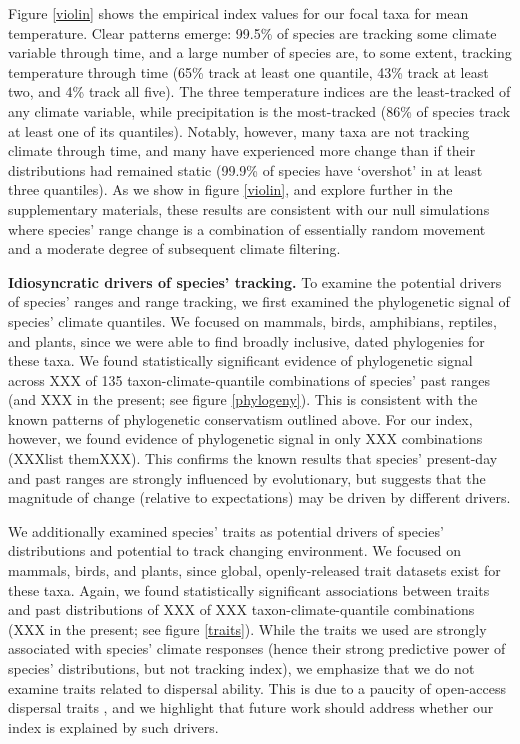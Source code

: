 \documentclass[12pt]{report}
\begin{document}
Figure \ref{violin} shows the empirical index values for our focal
taxa for mean temperature. Clear patterns emerge: 99.5\% of species
are tracking some climate variable through time, and a large number of
species are, to some extent, tracking temperature through time (65\%
track at least one quantile, 43\% track at least two, and 4\% track
all five). The three temperature indices are the least-tracked of any
climate variable, while precipitation is the most-tracked (86\% of
species track at least one of its quantiles). Notably, however, many
taxa are not tracking climate through time, and many have experienced
more change than if their distributions had remained static (99.9\% of
species have `overshot' in at least three quantiles). As we show in
figure \ref{violin}, and explore further in the supplementary
materials, these results are consistent with our null simulations
where species' range change is a combination of essentially random
movement and a moderate degree of subsequent climate filtering.

\textbf{Idiosyncratic drivers of species' tracking.} To examine the
potential drivers of species' ranges and range tracking, we first
examined the phylogenetic signal of species' climate quantiles. We
focused on mammals\supercite{xxx}, birds\supercite{xxx},
amphibians\supercite{xxx}, reptiles\supercite{xxx}, and
plants\supercite{xxx}, since we were able to find broadly inclusive,
dated phylogenies for these taxa. We found statistically significant
evidence of phylogenetic signal across XXX of 135
taxon-climate-quantile combinations of species' past ranges (and XXX
in the present; see figure \ref{phylogeny}). This is consistent with
the known patterns of phylogenetic conservatism outlined above. For
our index, however, we found evidence of phylogenetic signal in only
XXX combinations (XXXlist themXXX). This confirms the known results
that species' present-day and past ranges are strongly influenced by
evolutionary, but suggests that the magnitude of change (relative to
expectations) may be driven by different drivers.

We additionally examined species' traits as potential drivers of
species' distributions and potential to track changing environment. We
focused on mammals\supercite{xxx}, birds\supercite{xxx}, and
plants\supercite{xxx}, since global, openly-released trait datasets
exist for these taxa. Again, we found statistically significant
associations between traits and past distributions of XXX of XXX
taxon-climate-quantile combinations (XXX in the present; see figure
\ref{traits}). While the traits we used are strongly associated with
species' climate responses\supercite{xxx} (hence their strong
predictive power of species' distributions, but not tracking index),
we emphasize that we do not examine traits related to dispersal
ability. This is due to a paucity of open-access dispersal traits
\supercite{xxx}, and we highlight that future work should address
whether our index is explained by such drivers.
\end{document}
